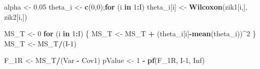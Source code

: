 \documentclass[
]{book}
\newenvironment{Shaded}{\begin{snugshade}}{\end{snugshade}}
\newcommand{\ControlFlowTok}[1]{\textcolor[rgb]{0.13,0.29,0.53}{\textbf{#1}}}
\newcommand{\DecValTok}[1]{\textcolor[rgb]{0.00,0.00,0.81}{#1}}
\newcommand{\FloatTok}[1]{\textcolor[rgb]{0.00,0.00,0.81}{#1}}
\newcommand{\KeywordTok}[1]{\textcolor[rgb]{0.13,0.29,0.53}{\textbf{#1}}}
\newcommand{\NormalTok}[1]{#1}
\newcommand{\OperatorTok}[1]{\textcolor[rgb]{0.81,0.36,0.00}{\textbf{#1}}}
\newcommand{\OtherTok}[1]{\textcolor[rgb]{0.56,0.35,0.01}{#1}}
\newcommand{\StringTok}[1]{\textcolor[rgb]{0.31,0.60,0.02}{#1}}
\begin{document}
\begin{Shaded}
\begin{Highlighting}[]
\NormalTok{alpha \textless{}{-}}\StringTok{ }\FloatTok{0.05}
\NormalTok{theta\_i \textless{}{-}}\StringTok{ }\KeywordTok{c}\NormalTok{(}\DecValTok{0}\NormalTok{,}\DecValTok{0}\NormalTok{);}\ControlFlowTok{for}\NormalTok{ (i }\ControlFlowTok{in} \DecValTok{1}\OperatorTok{:}\NormalTok{I) theta\_i[i] \textless{}{-}}\StringTok{ }\KeywordTok{Wilcoxon}\NormalTok{(zik1[i,], zik2[i,])}

\NormalTok{MS\_T \textless{}{-}}\StringTok{ }\DecValTok{0}
\ControlFlowTok{for}\NormalTok{ (i }\ControlFlowTok{in} \DecValTok{1}\OperatorTok{:}\NormalTok{I) \{}
\NormalTok{  MS\_T \textless{}{-}}\StringTok{ }\NormalTok{MS\_T }\OperatorTok{+}\StringTok{ }\NormalTok{(theta\_i[i]}\OperatorTok{{-}}\KeywordTok{mean}\NormalTok{(theta\_i))}\OperatorTok{\^{}}\DecValTok{2}
\NormalTok{\}}
\NormalTok{MS\_T \textless{}{-}}\StringTok{ }\NormalTok{MS\_T}\OperatorTok{/}\NormalTok{(I}\DecValTok{{-}1}\NormalTok{)}

\NormalTok{F\_1R \textless{}{-}}\StringTok{ }\NormalTok{MS\_T}\OperatorTok{/}\NormalTok{(Var }\OperatorTok{{-}}\StringTok{ }\NormalTok{Cov1)}
\NormalTok{pValue \textless{}{-}}\StringTok{ }\DecValTok{1} \OperatorTok{{-}}\StringTok{ }\KeywordTok{pf}\NormalTok{(F\_1R, I}\DecValTok{{-}1}\NormalTok{, }\OtherTok{Inf}\NormalTok{)}


\end{Highlighting}
\end{Shaded}
\end{document}
